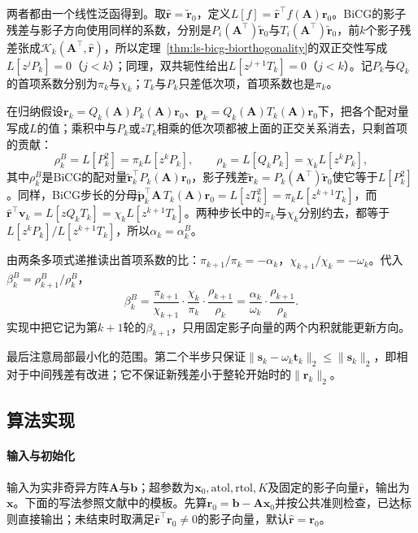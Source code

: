 两者都由一个线性泛函得到。取$\widehat{\bm r}=\widetilde{\bm r}_0$，定义$L[f]=\widehat{\bm r}^\top f(\bm A)\bm r_0$。BiCG的影子残差与影子方向使用同样的系数，分别是$P_i(\bm A^\top)\widetilde{\bm r}_0$与$T_i(\bm A^\top)\widetilde{\bm r}_0$，前$k$个影子残差张成$\mathcal K_k(\bm A^\top,\widehat{\bm r})$，所以定理~\ref{thm:ls-bicg-biorthogonality}的双正交性写成$L[z^jP_k]=0$（$j<k$）；同理，双共轭性给出$L[z^{j+1}T_k]=0$（$j<k$）。记$P_k$与$Q_k$的首项系数分别为$\pi_k$与$\chi_k$；$T_k$与$P_k$只差低次项，首项系数也是$\pi_k$。

在归纳假设$\bm r_k=Q_k(\bm A)P_k(\bm A)\bm r_0$、$\bm p_k=Q_k(\bm A)T_k(\bm A)\bm r_0$下，把各个配对量写成$L$的值；乘积中与$P_k$或$zT_k$相乘的低次项都被上面的正交关系消去，只剩首项的贡献：
\[
 \rho_k^{B}=L[P_k^2]=\pi_kL[z^kP_k],\qquad \rho_k=L[Q_kP_k]=\chi_kL[z^kP_k],
\]
其中$\rho_k^{B}$是BiCG的配对量$\widetilde{\bm r}_k^\top P_k(\bm A)\bm r_0$，影子残差$\widetilde{\bm r}_k=P_k(\bm A^\top)\widetilde{\bm r}_0$使它等于$L[P_k^2]$。同样，BiCG步长的分母$\widetilde{\bm p}_k^\top\bm A\,T_k(\bm A)\bm r_0=L[zT_k^2]=\pi_kL[z^{k+1}T_k]$，而$\widehat{\bm r}^\top\bm v_k=L[zQ_kT_k]=\chi_kL[z^{k+1}T_k]$。两种步长中的$\pi_k$与$\chi_k$分别约去，都等于$L[z^kP_k]/L[z^{k+1}T_k]$，所以$\alpha_k=\alpha_k^{B}$。

由两条多项式递推读出首项系数的比：$\pi_{k+1}/\pi_k=-\alpha_k$，$\chi_{k+1}/\chi_k=-\omega_k$。代入$\beta_k^{B}=\rho_{k+1}^{B}/\rho_k^{B}$，
\[
 \beta_k^{B}=\frac{\pi_{k+1}}{\chi_{k+1}}\cdot\frac{\chi_k}{\pi_k}\cdot\frac{\rho_{k+1}}{\rho_k}
 =\frac{\alpha_k}{\omega_k}\cdot\frac{\rho_{k+1}}{\rho_k}.
\]
实现中把它记为第$k+1$轮的$\beta_{k+1}$，只用固定影子向量的两个内积就能更新方向。

最后注意局部最小化的范围。第二个半步只保证$\lVert\bm s_k-\omega_k\bm t_k\rVert_2\le\lVert\bm s_k\rVert_2$，即相对于中间残差有改进；它不保证新残差小于整轮开始时的$\lVert\bm r_k\rVert_2$。

\subsection{算法实现}

\paragraph{输入与初始化}
输入为实非奇异方阵$\bm A$与$\bm b$；超参数为$\bm x_0,\mathrm{atol},\mathrm{rtol},K$及固定的影子向量$\widehat{\bm r}$，输出为$\bm x$。下面的写法参照文献中的模板。先算$\bm r_0=\bm b-\bm A\bm x_0$并按公共准则检查，已达标则直接输出；未结束时取满足$\widehat{\bm r}^\top\bm r_0\ne0$的影子向量，默认$\widehat{\bm r}=\bm r_0$。

